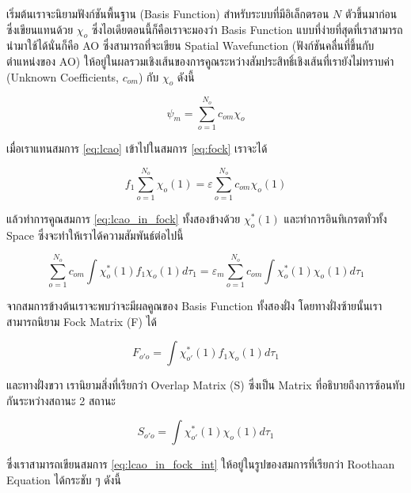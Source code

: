 เริ่มต้นเราจะนิยามฟังก์ชันพื้นฐาน (Basis Function) สำหรับระบบที่มีอิเล็กตรอน $N$ ตัวขึ้นมาก่อน ซึ่งเขียนแทนด้วย $\chi_{o}$
ซึ่งไอเดียตอนนี้ก็คือเราจะมองว่า Basis Function แบบที่ง่ายที่สุดที่เราสามารถนำมาใช้ได้นั่นก็คือ AO ซึ่งสามารถที่จะเขียน Spatial Wavefunction 
(ฟังก์ชันคลื่นที่ขึ้นกับตำแหน่งของ AO) ให้อยู่ในผลรวมเชิงเส้นของการคูณระหว่างสัมประสิทธิ์เชิงเส้นที่เรายังไม่ทราบค่า (Unknown Coefficients, 
$c_{om}$) กับ $\chi_{o}$ ดังนี้

\begin{equation}\label{eq:lcao}
    \psi_{m} = \sum^{N_{o}}_{o=1} c_{om} \chi_{o} 
\end{equation}

\noindent เมื่อเราแทนสมการ \ref{eq:lcao} เข้าไปในสมการ \ref{eq:fock} เราจะได้

\begin{equation}\label{eq:lcao_in_fock}
    f_{1} \sum^{N_{o}}_{o=1} \chi_{o}(1) = \varepsilon \sum^{N_{o}}_{o=1} c_{om} \chi_{o}(1)
\end{equation}

\noindent แล้วทำการคูณสมการ \ref{eq:lcao_in_fock} ทั้งสองข้างด้วย $\chi^{*}_{o}(1)$ และทำการอินทิเกรตทั่วทั้ง Space 
ซึ่งจะทำให้เราได้ความสัมพันธ์ต่อไปนี้

\begin{equation}\label{eq:lcao_in_fock_int}
    \sum^{N_{o}}_{o=1} c_{om} \int \chi^{*}_{o}(1) f_{1} \chi_{o}(1) d\tau_{1} =
    \varepsilon_{m} \sum^{N_{o}}_{o=1} c_{om} \int \chi^{*}_{o}(1) \chi_{o}(1) d\tau_{1}
\end{equation}

\noindent จากสมการข้างต้นเราจะพบว่าจะมีผลคูณของ Basis Function ทั้งสองฝั่ง โดยทางฝั่งซ้ายนั้นเราสามารถนิยาม Fock Matrix (F) ได้

\begin{equation}\label{eq:matrix_fock}
    F_{o'o} = \int \chi^{*}_{o'}(1) f_{1} \chi_{o}(1) d\tau_{1}
\end{equation}

\noindent และทางฝั่งขวา เรานิยามสิ่งที่เรียกว่า Overlap Matrix (S) ซึ่งเป็น Matrix ที่อธิบายถึงการซ้อนทับกันระหว่างสถานะ 2 สถานะ

\begin{equation}\label{eq:matrix_overlap}
    S_{o'o} = \int \chi^{*}_{o'}(1) \chi_{o}(1) d\tau_{1}
\end{equation}

\noindent ซึ่งเราสามารถเขียนสมการ \ref{eq:lcao_in_fock_int} ให้อยู่ในรูปของสมการที่เรียกว่า Roothaan Equation ได้กระชับ ๆ ดังนี้

